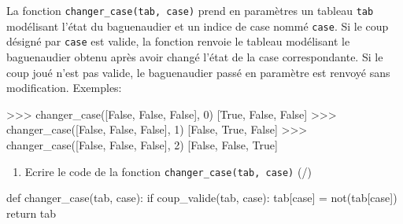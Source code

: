 \medskip

La fonction \verb|changer_case(tab, case)| prend en paramètres un tableau \texttt{tab} modélisant l'état du baguenaudier et un indice de case nommé \texttt{case}. Si le coup désigné par \texttt{case} est valide, la fonction renvoie le tableau modélisant le baguenaudier obtenu après avoir changé l'état de la case correspondante. Si le coup joué n'est pas valide, le baguenaudier passé en paramètre est renvoyé sans modification. 
Exemples:

\begin{CodePythontexAlt}[TaillePolice=\large, Largeur=1\linewidth,Centre,Lignes=true,PremLigne=1]{}
>>> changer_case([False, False, False], 0)
[True, False, False]
>>> changer_case([False, False, False], 1)
[False, True, False]
>>> changer_case([False, False, False], 2)
[False, False, True]
    
\end{CodePythontexAlt}
\begin{enumerate}[resume=monDS]
\item Ecrire le code de la fonction \verb|changer_case(tab, case)|  (/)
\end{enumerate}

\begin{blocvisible}[height=6]
    \begin{CodePythontexAlt}[TaillePolice=\large, Largeur=1\linewidth,Centre,Lignes=true,PremLigne=1]{}
    def changer_case(tab, case):
    if coup_valide(tab, case):
        tab[case] = not(tab[case])
    return tab
    \end{CodePythontexAlt}
\end{blocvisible}

\pagebreak



